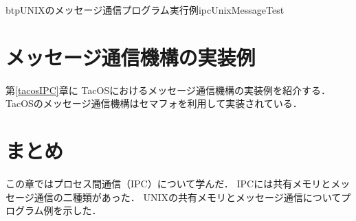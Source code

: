 \begin{myfig}{btp}{UNIXのメッセージ通信プログラム実行例}{ipcUnixMessageTest}
  
\end{myfig}

\section{メッセージ通信機構の実装例}
第\ref{tacosIPC}章に
TacOSにおけるメッセージ通信機構の実装例を紹介する．
TacOSのメッセージ通信機構はセマフォを利用して実装されている．

\section{まとめ}
この章ではプロセス間通信（IPC）について学んだ．
IPCには共有メモリとメッセージ通信の二種類があった．
UNIXの共有メモリとメッセージ通信についてプログラム例を示した．

